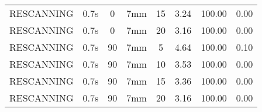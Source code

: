 \begin{table}[H]
\begin{tabular}{|c||c|c|c|c||c|c|c|}
RESCANNING & 0.7s & 0 & 7mm & 15 & 3.24 & 100.00 & 0.00 \\
RESCANNING & 0.7s & 0 & 7mm & 20 & 3.16 & 100.00 & 0.00 \\
RESCANNING & 0.7s & 90 & 7mm & 5 & 4.64 & 100.00 & 0.10 \\
RESCANNING & 0.7s & 90 & 7mm & 10 & 3.53 & 100.00 & 0.00 \\
RESCANNING & 0.7s & 90 & 7mm & 15 & 3.36 & 100.00 & 0.00 \\
RESCANNING & 0.7s & 90 & 7mm & 20 & 3.16 & 100.00 & 0.00 \\
    \hline\hline 
  \end{tabular}
  \label{tab:Pat07_RPV}
\end{table}

\newpage
\thispagestyle{realempty}
\vspace*{-2cm}

